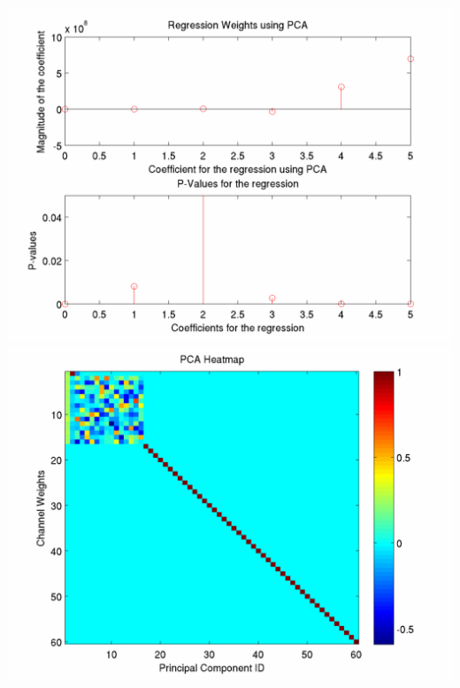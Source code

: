 \documentclass[12pt]{article}
\begin{document}
\includegraphics[scale=0.2]{PCA_regression_weights_p_value.png}
\includegraphics[scale=0.2]{PCA_heatmap.png}
\end{document}
